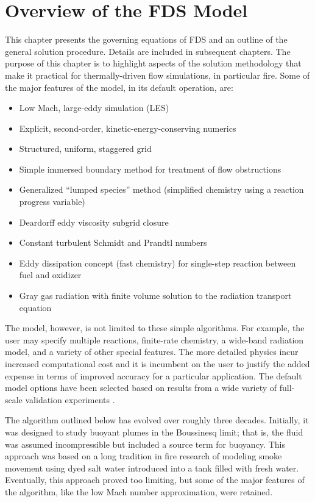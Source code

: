 
\chapter{Overview of the FDS Model}

\label{basisformodel}

This chapter presents the governing equations of FDS and an outline of the general solution procedure. Details are included in subsequent chapters. The purpose of this chapter is to highlight aspects of the solution methodology that make it practical for thermally-driven flow simulations, in particular fire. Some of the major features of the model, in its default operation, are:
\begin{itemize}
\item Low Mach, large-eddy simulation (LES)
\item Explicit, second-order, kinetic-energy-conserving numerics
\item Structured, uniform, staggered grid
\item Simple immersed boundary method for treatment of flow obstructions
\item Generalized ``lumped species'' method (simplified chemistry using a reaction progress variable)
\item Deardorff eddy viscosity subgrid closure
\item Constant turbulent Schmidt and Prandtl numbers
\item Eddy dissipation concept (fast chemistry) for single-step reaction between fuel and oxidizer
\item Gray gas radiation with finite volume solution to the radiation transport equation
\end{itemize}
The model, however, is not limited to these simple algorithms. For example, the user may specify multiple reactions, finite-rate chemistry, a wide-band radiation model, and a variety of other special features. The more detailed physics incur increased computational cost and it is incumbent on the user to justify the added expense in terms of improved accuracy for a particular application.  The default model options have been selected based on results from a wide variety of full-scale validation experiments \cite{FDS_Validation_Guide}.

The algorithm outlined below has evolved over roughly three decades. Initially, it was designed to study buoyant plumes in the Boussinesq limit; that is, the fluid was assumed incompressible but included a source term for buoyancy. This approach was based on a long tradition in fire research of modeling smoke movement using dyed salt water introduced into a tank filled with fresh water. Eventually, this approach proved too limiting, but some of the major features of the algorithm, like the low Mach number approximation, were retained.


